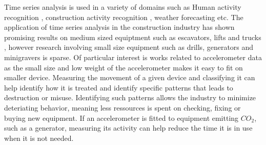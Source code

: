 Time series analysis is used in a variety of domains such as Human activity recognition \cite{HumanActivityrecognitionAccelerometer}, construction activity recognition \cite{ConstructionRecognitionFractionalRandomForest}\cite{timeseriesDataAugmentationConstruction}, weather forecasting \cite{weatherForecastTimeSeries} etc. 
The application of time series analysis in the construction industry has shown promising results on medium sized equiptment such as escavators, lifts and trucks \cite{timeseriesDataAugmentationConstruction, constructionRecognitionMobileSensors,ConstructionRecognitionFractionalRandomForest}, however research involving small size equipment such as drills, generators and minigravers is sparse. 
Of particular interest is works related to accelerometer data \cite{HumanActivityrecognitionAccelerometer,timeseriesDataAugmentationConstruction} as the small size and low weight of the accelerometer makes it easy to fit on smaller device. 
Measuring the movement of a given device and classifying it can help identify how it is treated and identify specific patterns that leads to destruction or misuse. 
Identifying such patterns allows the industry to minimize deteriating behavior, meaning less ressources is spent on checking, fixing or buying new equipment. 
If an accelerometer is fitted to equipment emitting $CO_2$, such as a generator, measuring its activity can help reduce the time it is in use when it is not needed.\\
